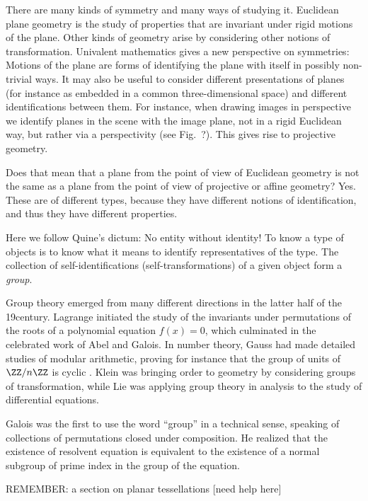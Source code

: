 There are many kinds of symmetry and many ways of studying it.
Euclidean plane geometry is the study of properties that are invariant under rigid motions of the plane.
Other kinds of geometry arise by considering other notions of transformation.
Univalent mathematics gives a new perspective on symmetries:
Motions of the plane are forms of identifying the plane with itself in possibly non-trivial ways.
It may also be useful to consider different presentations of planes
(for instance as embedded in a common three-dimensional space)
and different identifications between them.
For instance, when drawing images in perspective
we identify planes in the scene with the image plane,
not in a rigid Euclidean way, but
rather via a perspectivity (see Fig.~?).
This gives rise to projective geometry.

Does that mean that a plane from the point of view of Euclidean
geometry is not the same as a plane from the point of view of
projective or affine geometry?
Yes.
These are of different types,
because they have different notions of identification,
and thus they have different properties.

Here we follow Quine's dictum: No entity without identity!
To know a type of objects is to know what it means to identify representatives of the type.
The collection of self-identifications (self-transformations) of a given object form a \emph{group}.


Group theory emerged from many different directions in the latter half of the 19\th century.
Lagrange initiated the study of the invariants under permutations
of the roots of a polynomial equation $f(x)=0$,
which culminated in the celebrated work of Abel and Galois.
In number theory, Gauss had made detailed studies of modular arithmetic,
proving for instance that the group of units of 
 $\ZZ/n\ZZ$ is cyclic .
Klein was bringing order to geometry by considering groups of transformation,
while Lie was applying group theory in analysis to the study of differential equations.

Galois was the first to use the word ``group'' in a technical sense,
speaking of collections of permutations closed under composition.
He realized that the existence of resolvent equation is equivalent
to the existence of a normal subgroup of prime index
in the group of the equation.


REMEMBER: a section on planar tessellations [need help here]


